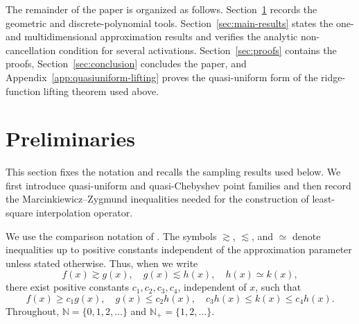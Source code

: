 \documentclass{article}
\numberwithin{equation}{section}
\def\NN{\mathbb{N}}
\begin{document}
The remainder of the paper is organized as follows. Section~\ref{sec:preliminaries} records the geometric and discrete-polynomial tools. Section~\ref{sec:main-results} states the one- and multidimensional approximation results and verifies the analytic non-cancellation condition for several activations. Section~\ref{sec:proofs} contains the proofs, Section~\ref{sec:conclusion} concludes the paper, and Appendix~\ref{app:quasiuniform-lifting} proves the quasi-uniform form of the ridge-function lifting theorem used above.


\section{Preliminaries}\label{sec:preliminaries}
This section fixes the notation and recalls the sampling results used below. We first introduce quasi-uniform and quasi-Chebyshev point families and then record the Marcinkiewicz--Zygmund inequalities needed for the construction of least-square interpolation operator.
 

We use the comparison notation of \cite{xu1992iterative}. The symbols $\gtrsim$, $\lesssim$, and $\simeq$ denote inequalities up to positive constants independent of the approximation parameter unless stated otherwise. Thus, when we write
$$
f(x)\gtrsim g(x),\quad g(x)\lesssim h(x),\quad h(x)\simeq k(x),
$$
there exist positive constants $c_1,c_2,c_3,c_4$, independent of $x$, such that
$$
f(x)\ge c_1 g(x),\quad g(x)\le c_2 h(x),\quad c_3 h(x)\le k(x)\le c_4 h(x).
$$
Throughout, $\NN=\{0,1,2,\ldots\}$ and $\mathbb N_+=\{1,2,\ldots\}$.
\end{document}
